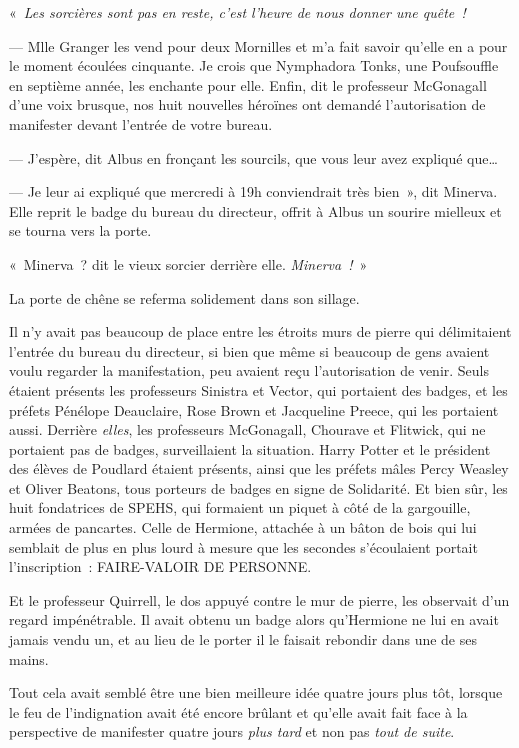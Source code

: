 «~\emph{Les sorcières sont pas en reste, c'est l'heure de nous donner une quête~!}

--- Mlle Granger les vend pour deux Mornilles et m'a fait savoir qu'elle en a pour le moment écoulées cinquante.
Je crois que Nymphadora Tonks, une Poufsouffle en septième année, les enchante pour elle.
Enfin, dit le professeur McGonagall d'une voix brusque, nos huit nouvelles héroïnes ont demandé l'autorisation de manifester devant l'entrée de votre bureau.

--- J'espère, dit Albus en fronçant les sourcils, que vous leur avez expliqué que…

--- Je leur ai expliqué que mercredi à 19h conviendrait très bien~», dit Minerva.
Elle reprit le badge du bureau du directeur, offrit à Albus un sourire mielleux et se tourna vers la porte.

«~Minerva~? dit le vieux sorcier derrière elle.
\emph{Minerva~!}~»

La porte de chêne se referma solidement dans son sillage.

\later

Il n'y avait pas beaucoup de place entre les étroits murs de pierre qui délimitaient l'entrée du bureau du directeur, si bien que même si beaucoup de gens avaient voulu regarder la manifestation, peu avaient reçu l'autorisation de venir.
Seuls étaient présents les professeurs Sinistra et Vector, qui portaient des badges, et les préfets Pénélope Deauclaire, Rose Brown et Jacqueline Preece, qui les portaient aussi.
Derrière \emph{elles}, les professeurs McGonagall, Chourave et Flitwick, qui ne portaient pas de badges, surveillaient la situation.
Harry Potter et le président des élèves de Poudlard étaient présents, ainsi que les préfets mâles Percy Weasley et Oliver Beatons, tous porteurs de badges en signe de Solidarité.
Et bien sûr, les huit fondatrices de SPEHS, qui formaient un piquet à côté de la gargouille, armées de pancartes.
Celle de Hermione, attachée à un bâton de bois qui lui semblait de plus en plus lourd à mesure que les secondes s'écoulaient portait l'inscription~: FAIRE-VALOIR DE PERSONNE.

Et le professeur Quirrell, le dos appuyé contre le mur de pierre, les observait d'un regard impénétrable.
Il avait obtenu un badge alors qu'Hermione ne lui en avait jamais vendu un, et au lieu de le porter il le faisait rebondir dans une de ses mains.

Tout cela avait semblé être une bien meilleure idée quatre jours plus tôt, lorsque le feu de l'indignation avait été encore brûlant et qu'elle avait fait face à la perspective de manifester quatre jours \emph{plus tard} et non pas \emph{tout de suite}.

